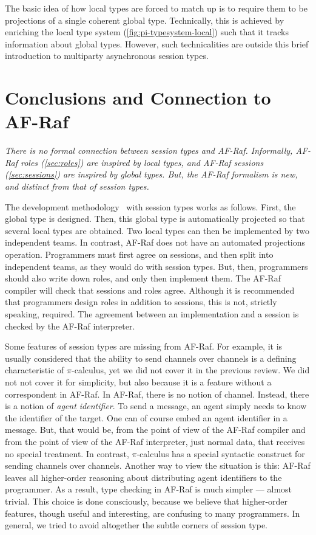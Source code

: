 \documentclass[a4paper,12pt,oneside,fleqn]{book} %
\begin{document}
The basic idea of how local types are forced to match up
  is to require them to be projections of a single coherent global type.
Technically,
  this is achieved by enriching the local type system
    (\autoref{fig:pi-typesystem-local})
  such that it tracks information about global types.
However, such technicalities are outside this brief introduction to
  multiparty asynchronous session types.

\section{Conclusions and Connection to AF-Raf}
\label{sec:mast-vs-afraf}

\emph{%
  There is no formal connection between session types and AF-Raf.
  Informally,
    AF-Raf roles (\autoref{sec:roles}) are inspired by local types,
    and AF-Raf sessions (\autoref{sec:sessions}) are inspired by global types.
  But, the AF-Raf formalism is new, and distinct from that of session types.
}

The development methodology~\cite{DBLP:journals/jacm/HondaYC16}
  with session types works as follows.
First, the global type is designed.
Then, this global type is automatically projected
  so that several local types are obtained.
Two local types can then be implemented by two independent teams.
In contrast, AF-Raf does not have an automated projections operation.
Programmers must first agree on sessions,
  and then split into independent teams,
  as they would do with session types.
But, then, programmers should also write down roles,
  and only then implement them.
The AF-Raf compiler will check that sessions and roles agree.
Although it is recommended that programmers design roles in addition to
sessions, this is not, strictly speaking, required.
The agreement between an implementation and a session
  is checked by the AF-Raf interpreter.

Some features of session types are missing from AF-Raf.
For example, it is usually considered that the ability to send channels
over channels is a defining characteristic of $\pi$-calculus,
  yet we did not cover it in the previous review.
We did not not cover it for simplicity,
  but also because it is a feature without a correspondent in AF-Raf.
In AF-Raf, there is no notion of channel.
Instead,
  there is a notion of \emph{agent identifier}.
To send a message,
  an agent simply needs to know the identifier of the target.
One can of course embed an agent identifier in a message.
But, that would be, from the point of view of the AF-Raf compiler and from
the point of view of the AF-Raf interpreter, just normal data, that
receives no special treatment.
In contrast,
  $\pi$-calculus has a special syntactic construct for sending channels
  over channels.
Another way to view the situation is this:
  AF-Raf leaves all higher-order reasoning about distributing agent
  identifiers to the programmer.
As a result, type checking in AF-Raf is much simpler
  --- almost trivial.
This choice is done consciously,
  because we believe that higher-order features,
    though useful and interesting,
    are confusing to many programmers.
In general,
  we tried to avoid altogether the subtle corners of session type.
\end{document}
